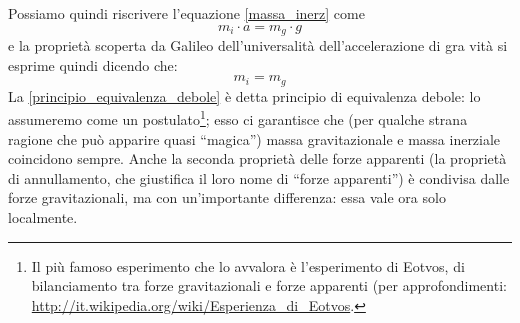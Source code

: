 Possiamo quindi riscrivere l'equazione \ref{massa_inerz} come
\begin{equation}
m_i \cdot a = m_g \cdot g
\end{equation}
e la proprietà scoperta da Galileo dell'universalità dell'accelerazione di gra\-
vità si esprime quindi dicendo che:
\begin{equation}\label{principio_equivalenza_debole}
m_i = m_g 
\end{equation}
La \ref{principio_equivalenza_debole} è detta principio di equivalenza debole: lo assumeremo
come un postulato\footnote{Il più famoso esperimento che lo avvalora è l’esperimento di Eotvos, di bilanciamento
tra forze gravitazionali e forze apparenti (per approfondimenti: \url{http://it.wikipedia.org/wiki/Esperienza_di_Eotvos}.};
esso ci garantisce che (per qualche strana ragione che può apparire quasi ``magica'') massa gravitazionale e massa inerziale
coincidono sempre.
Anche la seconda proprietà delle forze apparenti (la proprietà di an\-nullamento, che giustifica il loro nome di ``forze apparenti'')
è condivisa dalle forze gravitazionali, ma con un'importante differenza: essa vale ora solo localmente.

